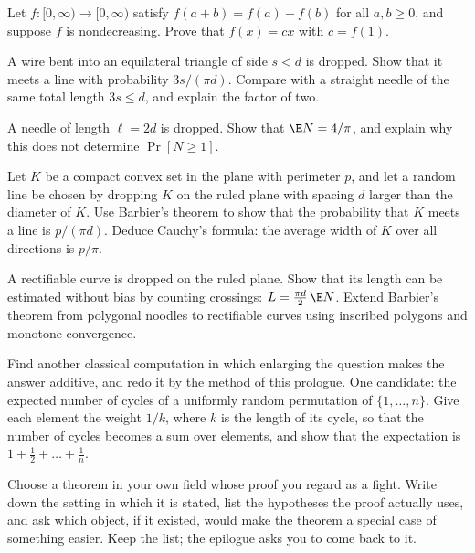 \begin{refsection}
\begin{exercises}
\item\label{ex:prologue:cauchy} \consolidation Let $f\colon[0,\infty)\to[0,\infty)$ satisfy $f(a+b)=f(a)+f(b)$ for all $a,b\ge 0$, and suppose $f$ is nondecreasing. Prove that $f(x)=cx$ with $c=f(1)$. 
\item \consolidation A wire bent into an equilateral triangle of side $s<d$ is dropped. Show that it meets a line with probability $3s/(\pi d)$. Compare with a straight needle of the same total length $3s\le d$, and explain the factor of two.
\item \consolidation A needle of length $\ell = 2d$ is dropped. Show that $\E N = 4/\pi$, and explain why this does not determine $\Pr[N\ge 1]$.
\item \transfer\hard Let $K$ be a compact convex set in the plane with perimeter $p$, and let a random line be chosen by dropping $K$ on the ruled plane with spacing $d$ larger than the diameter of $K$. Use Barbier's theorem to show that the probability that $K$ meets a line is $p/(\pi d)$. Deduce Cauchy's formula: the average width of $K$ over all directions is $p/\pi$.
\item \transfer\hard A rectifiable curve is dropped on the ruled plane. Show that its length can be estimated without bias by counting crossings: $L = \frac{\pi d}{2}\,\E N$. Extend Barbier's theorem from polygonal noodles to rectifiable curves using inscribed polygons and monotone convergence. 
\item \transfer Find another classical computation in which enlarging the question makes the answer additive, and redo it by the method of this prologue. One candidate: the expected number of cycles of a uniformly random permutation of $\{1,\dots,n\}$. Give each element the weight $1/k$, where $k$ is the length of its cycle, so that the number of cycles becomes a sum over elements, and show that the expectation is $1+\frac12+\dots+\frac1n$.
\item \research Choose a theorem in your own field whose proof you regard as a fight. Write down the setting in which it is stated, list the hypotheses the proof actually uses, and ask which object, if it existed, would make the theorem a special case of something easier. Keep the list; the epilogue asks you to come back to it.
\end{exercises}


\end{refsection}
